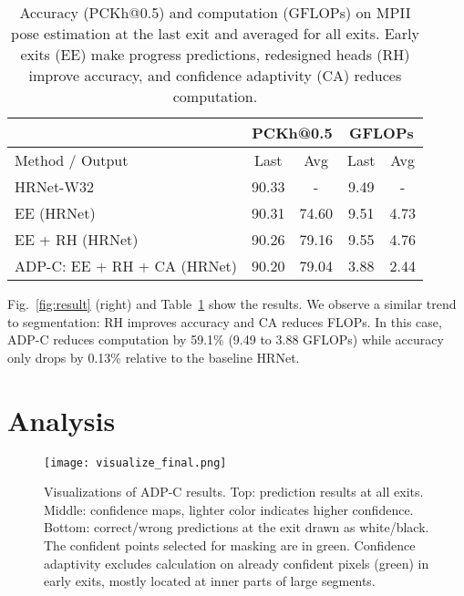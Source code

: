 \setlength{\tabcolsep}{4pt}
\renewcommand{\arraystretch}{1.2}
\begin{table}[h]
\centering
\small
\vspace{-1ex}
\begin{tabular}{l|cc|cc}
\hline
                        & \multicolumn{2}{c|}{PCKh@0.5} & \multicolumn{2}{c}{GFLOPs} \\ \hline
Method / Output         & Last                & Avg                & Last                & Avg                \\ \hline
HRNet-W32 \cite{wang2020deep}     & 90.33               & -                  & 9.49                & -                  \\ \hline
EE (HRNet)          & 90.31               & 74.60               & 9.51                & 4.73               \\ \hline
EE + RH (HRNet)    & 90.26               & 79.16              & 9.55                & 4.76               \\
ADP-C: EE + RH + CA (HRNet) & 90.20               & 79.04              & 3.88                & 2.44               \\ \hline
\end{tabular}
\caption{%
Accuracy (PCKh@0.5) and computation (GFLOPs) on MPII pose estimation at the last exit and averaged for all exits.
Early exits (EE) make progress predictions, redesigned heads (RH) improve accuracy, and confidence adaptivity (CA) reduces computation.
}
\label{tab:pose}
\end{table}
 
Fig.~\ref{fig:result} (right) and Table~\ref{tab:pose} show the results.
We observe a similar trend to segmentation: RH improves accuracy and CA reduces FLOPs.
In this case, ADP-C reduces computation by 59.1\% (9.49 to 3.88 GFLOPs) while accuracy only drops by 0.13\% relative to the baseline HRNet. 


\section{Analysis}
\label{sec:analysis}


\begin{figure}[h]
\texttt{[image: visualize\_final.png]}
\caption{%
Visualizations of ADP-C results.
Top: prediction results at all exits.
Middle: confidence maps, lighter color indicates higher confidence.
Bottom: correct/wrong predictions at the exit drawn as white/black.
The confident points selected for masking are in green.
Confidence adaptivity excludes calculation on already confident pixels (green) in early exits, mostly located at inner parts of large segments.}
\label{fig:vis}
\end{figure}



